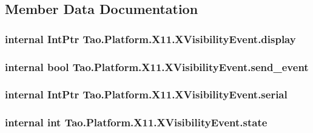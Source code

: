 \subsection{Member Data Documentation}
\hypertarget{struct_tao_1_1_platform_1_1_x11_1_1_x_visibility_event_a6ae46a7a76d60e78d8f6e377ce91ffa0}{
\subsubsection[{display}]{\setlength{\rightskip}{0pt plus 5cm}internal IntPtr {\bf Tao.Platform.X11.XVisibilityEvent.display}}}
\label{struct_tao_1_1_platform_1_1_x11_1_1_x_visibility_event_a6ae46a7a76d60e78d8f6e377ce91ffa0}
\hypertarget{struct_tao_1_1_platform_1_1_x11_1_1_x_visibility_event_a58d5630d51591ab3ceb573cf99d2e49d}{
\subsubsection[{send\_\-event}]{\setlength{\rightskip}{0pt plus 5cm}internal bool {\bf Tao.Platform.X11.XVisibilityEvent.send\_\-event}}}
\label{struct_tao_1_1_platform_1_1_x11_1_1_x_visibility_event_a58d5630d51591ab3ceb573cf99d2e49d}
\hypertarget{struct_tao_1_1_platform_1_1_x11_1_1_x_visibility_event_aaeb54fa34e94b90552d0fd8d161abe18}{
\subsubsection[{serial}]{\setlength{\rightskip}{0pt plus 5cm}internal IntPtr {\bf Tao.Platform.X11.XVisibilityEvent.serial}}}
\label{struct_tao_1_1_platform_1_1_x11_1_1_x_visibility_event_aaeb54fa34e94b90552d0fd8d161abe18}
\hypertarget{struct_tao_1_1_platform_1_1_x11_1_1_x_visibility_event_a7e9bffd2bc39421bd7e085e019ae74ca}{
\subsubsection[{state}]{\setlength{\rightskip}{0pt plus 5cm}internal int {\bf Tao.Platform.X11.XVisibilityEvent.state}}}
